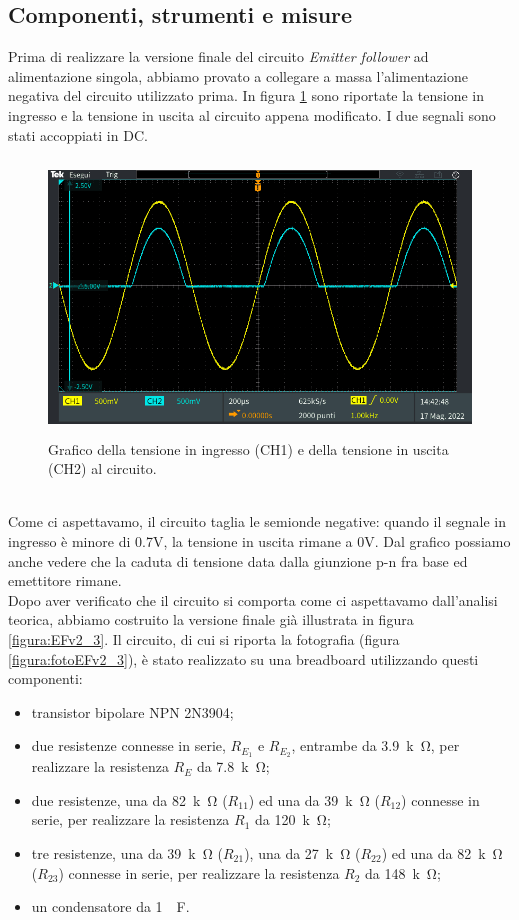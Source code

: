\documentclass{report}
\begin{document}
\subsection{Componenti, strumenti e misure} 
Prima di realizzare la versione finale del circuito \textit{Emitter follower} ad alimentazione singola, abbiamo provato a collegare a massa l'alimentazione negativa del circuito utilizzato prima. In figura \ref{figura:oscillo2} sono riportate la tensione in ingresso e la tensione in uscita al circuito appena modificato. I due segnali sono stati accoppiati in DC.
\begin{figure}[h]
\centering
\includegraphics[height=7.3cm]{immagini/oscillo2}
\caption{Grafico della tensione in ingresso (CH1) e della tensione in uscita (CH2) al circuito.}
\label{figura:oscillo2}
\end{figure}
\\\indent Come ci aspettavamo, il circuito taglia le semionde negative: quando il segnale in ingresso è minore di 0.7V, la tensione in uscita rimane a 0V. Dal grafico possiamo anche vedere che la caduta di tensione data dalla giunzione p-n fra base ed emettitore rimane.
\\\indent Dopo aver verificato che il circuito si comporta come ci aspettavamo dall'analisi teorica, abbiamo costruito la versione finale già illustrata in figura \ref{figura:EFv2_3}. Il circuito, di cui si riporta la fotografia (figura \ref{figura:fotoEFv2_3}), è stato realizzato su una breadboard utilizzando questi componenti:
\begin{itemize}
\item transistor bipolare NPN 2N3904;
\item due resistenze connesse in serie, $R_{E_1}$ e $R_{E_2}$, entrambe da \SI{3.9}{k\ohm}, per realizzare la resistenza $R_E$ da \SI{7.8}{k\ohm};
\item due resistenze, una da \SI{82}{k\ohm} ($R_{11}$) ed una da \SI{39}{k\ohm} ($R_{12}$) connesse in serie, per realizzare la resistenza $R_1$ da \SI{120}{k\ohm};
\item tre resistenze, una da \SI{39}{k\ohm} ($R_{21}$), una da \SI{27}{k\ohm} ($R_{22}$) ed una da \SI{82}{k\ohm} ($R_{23}$) connesse in serie, per realizzare la resistenza $R_2$ da \SI{148}{k\ohm};
\item un condensatore da \SI{1}{\mu\farad}.
\end{itemize}
\end{document}
